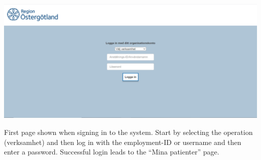 \begin{center}
    \includegraphics[width=\linewidth]{images/Login_Image.png}
    \label{fig:figures}
\end{center}
First page shown when signing in to the system. Start by selecting the operation (verksamhet) and then log in with the employment-ID or username and then enter a password. Successful login leads to the “Mina patienter” page.
